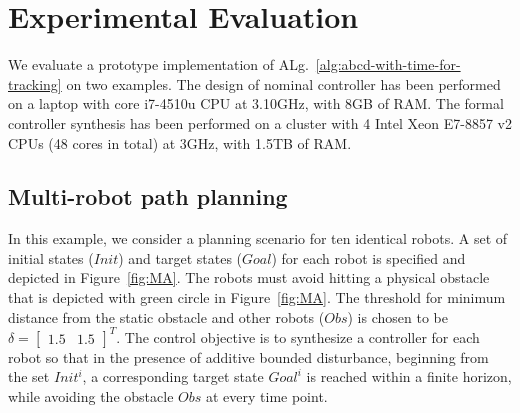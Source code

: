 
\section{Experimental Evaluation}\label{sec:experiments}
We evaluate a prototype implementation of ALg.~\ref{alg:abcd-with-time-for-tracking}
on two examples. 
The design of nominal controller has been performed on a laptop with core i7-4510u CPU at 3.10GHz, with 8GB of
RAM.
The formal controller synthesis has been performed
on a cluster with 4 Intel Xeon E7-8857 v2 CPUs (48 cores in total) at 3GHz, with 1.5TB of
RAM. %

\subsection{Multi-robot path planning}\label{sec:Multirobot}
In this example, we consider a planning scenario for ten identical robots. A set of initial states ($Init$) and target states ($Goal$) for each robot is specified and depicted in Figure~\ref{fig:MA}. The robots must avoid hitting a physical obstacle that is depicted with green circle in Figure~\ref{fig:MA}. %
The threshold for minimum distance from the static obstacle and other robots ($Obs$) is chosen to be $\delta=\begin{bmatrix}1.5&1.5\end{bmatrix}^T$. %
The control objective is to synthesize a controller for each robot so that in the presence of additive bounded disturbance, beginning from the set $Init^i$, a corresponding target state $Goal^i$ is reached within a finite horizon, while avoiding the obstacle $Obs$ at every time point. 

